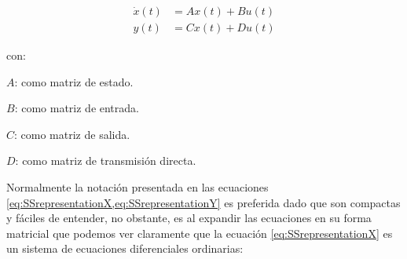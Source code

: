 			\begin{align}
                \dot{x}(t) &= Ax(t) + Bu(t) \label{eq:SSrepresentationX} \\
				y(t) &= Cx(t) + Du(t) \label{eq:SSrepresentationY}
			\end{align}
			
			\begin{spacing}{1.5}
				\noindent con: 
				
				$A$: como matriz de estado.
				
				$B$: como matriz de entrada.
				
				$C$: como matriz de salida.
				
				$D$: como matriz de transmisión directa.
				
            \end{spacing}
            
            Normalmente la notación presentada en las ecuaciones \cref{eq:SSrepresentationX,eq:SSrepresentationY} es preferida dado que son compactas y fáciles de entender, no obstante, es al expandir las ecuaciones en su forma matricial que podemos ver claramente que la ecuación \cref{eq:SSrepresentationX} es un sistema de ecuaciones diferenciales ordinarias:
            
